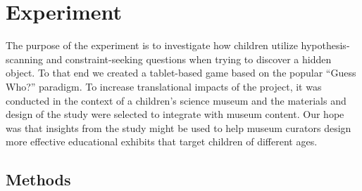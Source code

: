 \documentclass[man,floatsintext]{apa6}
\begin{document}
\section{Experiment}
The purpose of the experiment is to investigate how children utilize hypothesis-
scanning and constraint-seeking questions when trying to discover a hidden object.
To that end we created 
a tablet-based game based on the popular ``Guess 
Who?'' paradigm.   To increase translational impacts of the project, it was
conducted in the context of a children's science museum and the materials and 
design of the study were selected to integrate with museum content.
Our hope was that insights from the study might be used to help museum curators
design more effective educational exhibits that target children of different ages.

\subsection{Methods}
\end{document}
